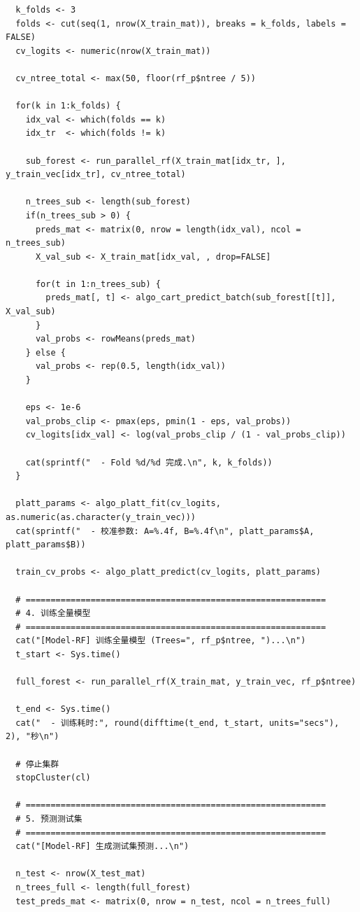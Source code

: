 \documentclass[11pt, a4paper]{article}
\begin{document}
\begin{verbatim}
  k_folds <- 3
  folds <- cut(seq(1, nrow(X_train_mat)), breaks = k_folds, labels = FALSE)
  cv_logits <- numeric(nrow(X_train_mat))
  
  cv_ntree_total <- max(50, floor(rf_p$ntree / 5)) 
  
  for(k in 1:k_folds) {
    idx_val <- which(folds == k)
    idx_tr  <- which(folds != k)

    sub_forest <- run_parallel_rf(X_train_mat[idx_tr, ], y_train_vec[idx_tr], cv_ntree_total)

    n_trees_sub <- length(sub_forest)
    if(n_trees_sub > 0) {
      preds_mat <- matrix(0, nrow = length(idx_val), ncol = n_trees_sub)
      X_val_sub <- X_train_mat[idx_val, , drop=FALSE]
      
      for(t in 1:n_trees_sub) {
        preds_mat[, t] <- algo_cart_predict_batch(sub_forest[[t]], X_val_sub)
      }
      val_probs <- rowMeans(preds_mat)
    } else {
      val_probs <- rep(0.5, length(idx_val))
    }

    eps <- 1e-6
    val_probs_clip <- pmax(eps, pmin(1 - eps, val_probs))
    cv_logits[idx_val] <- log(val_probs_clip / (1 - val_probs_clip))
    
    cat(sprintf("  - Fold %d/%d 完成.\n", k, k_folds))
  }

  platt_params <- algo_platt_fit(cv_logits, as.numeric(as.character(y_train_vec)))
  cat(sprintf("  - 校准参数: A=%.4f, B=%.4f\n", platt_params$A, platt_params$B))

  train_cv_probs <- algo_platt_predict(cv_logits, platt_params)

  # ============================================================
  # 4. 训练全量模型
  # ============================================================
  cat("[Model-RF] 训练全量模型 (Trees=", rf_p$ntree, ")...\n")
  t_start <- Sys.time()
  
  full_forest <- run_parallel_rf(X_train_mat, y_train_vec, rf_p$ntree)
  
  t_end <- Sys.time()
  cat("  - 训练耗时:", round(difftime(t_end, t_start, units="secs"), 2), "秒\n")
  
  # 停止集群
  stopCluster(cl)
  
  # ============================================================
  # 5. 预测测试集
  # ============================================================
  cat("[Model-RF] 生成测试集预测...\n")
  
  n_test <- nrow(X_test_mat)
  n_trees_full <- length(full_forest)
  test_preds_mat <- matrix(0, nrow = n_test, ncol = n_trees_full)
  

\end{verbatim}
\end{document}
